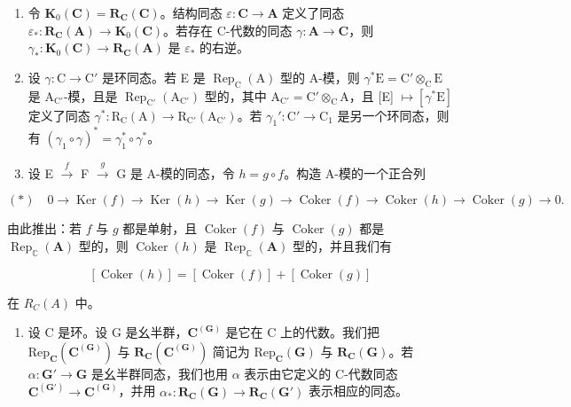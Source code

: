 \begin{enumerate}
\def\labelenumi{\alph{enumi})}
\setcounter{enumi}{1}
\item
  令 \(\mathbf{K}_0(\mathbf{C}) = \mathbf{R}_{\mathbf{C}}(\mathbf{C})\)。结构同态 \(\varepsilon: \mathbf{C} \to \mathbf{A}\) 定义了同态 \(\varepsilon_*: \mathbf{R}_{\mathbf{C}}(\mathbf{A}) \to \mathbf{K}_0(\mathbf{C})\)。若存在 C-代数的同态 \(\gamma: \mathbf{A} \to \mathbf{C}\)，则 \(\gamma_*: \mathbf{K}_0(\mathbf{C}) \to \mathbf{R}_{\mathbf{C}}(\mathbf{A})\) 是 \(\varepsilon_*\) 的右逆。
\item
  设 \(\gamma: \mathrm{C} \to \mathrm{C}'\) 是环同态。若 E 是 \(\operatorname{Rep}_{\mathrm{C}}(\mathrm{A})\) 型的 A-模，则 \(\gamma^{*}\mathrm{E} = \mathrm{C}' \otimes_{\mathrm{C}} \mathrm{E}\) 是 \(\mathrm{A}_{\mathrm{C}'}\)-模，且是 \(\operatorname{Rep}_{\mathrm{C}'}(\mathrm{A}_{\mathrm{C}'})\) 型的，其中 \(\mathrm{A}_{\mathrm{C}'} = \mathrm{C}' \otimes_{\mathrm{C}} \mathrm{A}\)，且 {[}E{]} \(\mapsto [\gamma^{*}\mathrm{E}]\) 定义了同态 \(\gamma^{*}: \mathrm{R}_{\mathrm{C}}(\mathrm{A}) \to \mathrm{R}_{\mathrm{C}'}(\mathrm{A}_{\mathrm{C}'})\)。若 \(\gamma_{1}': \mathrm{C}' \to \mathrm{C}_{1}\) 是另一个环同态，则有 \((\gamma_{1} \circ \gamma)^{*} = \gamma_{1}^{*} \circ \gamma^{*}\)。
\item
  设 E \(\xrightarrow{f}\) F \(\xrightarrow{g}\) G 是 A-模的同态，令 \(h = g \circ f\)。构造 A-模的一个正合列
\end{enumerate}

\[
(*) \quad 0 \rightarrow \operatorname{Ker} (f) \rightarrow \operatorname{Ker} (h) \rightarrow \operatorname{Ker} (g) \rightarrow \operatorname{Coker} (f) \rightarrow \operatorname{Coker} (h) \rightarrow \operatorname{Coker} (g) \rightarrow 0.
\]

由此推出：若 \(f\) 与 \(g\) 都是单射，且 \(\operatorname{Coker}(f)\) 与 \(\operatorname{Coker}(g)\) 都是 \(\operatorname{Rep}_{\mathbb{C}}(\mathbf{A})\) 型的，则 \(\operatorname{Coker}(h)\) 是 \(\operatorname{Rep}_{\mathbb{C}}(\mathbf{A})\) 型的，并且我们有

\[
[ \operatorname{Coker} (h) ] = [ \operatorname{Coker} (f) ] + [ \operatorname{Coker} (g) ]
\]

在 \(R_{C}(A)\) 中。

\begin{enumerate}
\def\labelenumi{\arabic{enumi})}
\setcounter{enumi}{54}
\tightlist
\item
  设 C 是环。设 G 是幺半群，\(\mathbf{C}^{(\mathbf{G})}\) 是它在 C 上的代数。我们把 \(\mathrm{Rep}_{\mathbf{C}}(\mathbf{C}^{(\mathbf{G})})\) 与 \(\mathbf{R}_{\mathbf{C}}(\mathbf{C}^{(\mathbf{G})})\) 简记为 \(\mathrm{Rep}_{\mathbf{C}}(\mathbf{G})\) 与 \(\mathbf{R}_{\mathbf{C}}(\mathbf{G})\)。若 \(\alpha : \mathbf{G}' \to \mathbf{G}\) 是幺半群同态，我们也用 \(\alpha\) 表示由它定义的 C-代数同态 \(\mathbf{C}^{(\mathbf{G}')} \to \mathbf{C}^{(\mathbf{G})}\)，并用 \(\alpha_{*}: \mathbf{R}_{\mathbf{C}}(\mathbf{G}) \to \mathbf{R}_{\mathbf{C}}(\mathbf{G}')\) 表示相应的同态。
\end{enumerate}

